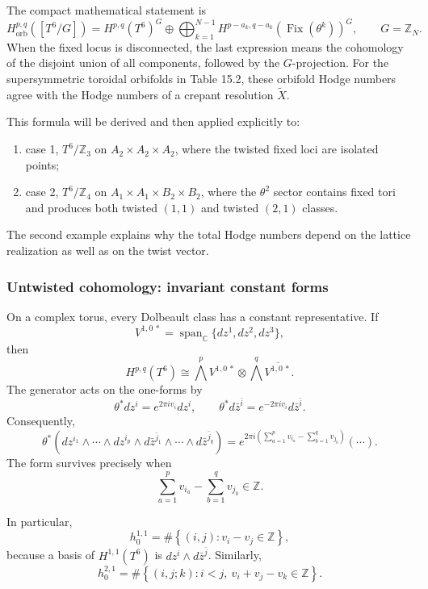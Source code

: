 \documentclass[
  10pt,
  a4paper,
  openany]{book}
\providecommand{\tightlist}{%
  \setlength{\itemsep}{0pt}\setlength{\parskip}{0pt}}
\begin{document}
The compact mathematical statement is \[
\boxed{
H_{\mathrm{orb}}^{p,q}([T^6/G])
=
H^{p,q}(T^6)^G
\oplus
\bigoplus_{k=1}^{N-1}
H^{p-a_k,q-a_k}\!\left(\operatorname{Fix}(\theta^k)\right)^G
},
\qquad G=\mathbb Z_N.
\] When the fixed locus is disconnected, the last expression means the
cohomology of the disjoint union of all components, followed by the
\(G\)-projection. For the supersymmetric toroidal orbifolds in Table
15.2, these orbifold Hodge numbers agree with the Hodge numbers of a
crepant resolution \(\widetilde X\).

This formula will be derived and then applied explicitly to:

\begin{enumerate}
\def\labelenumi{\arabic{enumi}.}
\tightlist
\item
  case 1, \(T^6/\mathbb Z_3\) on \(A_2\times A_2\times A_2\), where the
  twisted fixed loci are isolated points;
\item
  case 2, \(T^6/\mathbb Z_4\) on \(A_1\times A_1\times B_2\times B_2\),
  where the \(\theta^2\) sector contains fixed tori and produces both
  twisted \((1,1)\) and twisted \((2,1)\) classes.
\end{enumerate}

The second example explains why the total Hodge numbers depend on the
lattice realization as well as on the twist vector.

\subsubsection{Untwisted cohomology: invariant constant
forms}\label{untwisted-cohomology-invariant-constant-forms}

On a complex torus, every Dolbeault class has a constant representative.
If \[
V^{1,0\,*}
=\operatorname{span}_{\mathbb C}\{dz^1,dz^2,dz^3\},
\] then \[
H^{p,q}(T^6)
\cong
\bigwedge^p V^{1,0\,*}
\otimes
\bigwedge^q\overline{V^{1,0\,*}}.
\] The generator acts on the one-forms by \[
\theta^*dz^i=e^{2\pi i v_i}dz^i,
\qquad
\theta^*d\bar z^{\bar i}=e^{-2\pi i v_i}d\bar z^{\bar i}.
\] Consequently, \[
\theta^*
\left(
dz^{i_1}\wedge\cdots\wedge dz^{i_p}
\wedge
d\bar z^{\bar j_1}\wedge\cdots\wedge d\bar z^{\bar j_q}
\right)
=
e^{2\pi i\left(
\sum_{a=1}^p v_{i_a}
-
\sum_{b=1}^q v_{j_b}
\right)}
\left(\cdots\right).
\] The form survives precisely when \[
\sum_{a=1}^p v_{i_a}
-
\sum_{b=1}^q v_{j_b}
\in\mathbb Z.
\]

In particular, \[
h_0^{1,1}
=
\#\left\{(i,j):v_i-v_j\in\mathbb Z\right\},
\] because a basis of \(H^{1,1}(T^6)\) is
\(dz^i\wedge d\bar z^{\bar j}\). Similarly, \[
h_0^{2,1}
=
\#\left\{(i,j;k):
i<j,\ 
v_i+v_j-v_k\in\mathbb Z
\right\}.
\]
\end{document}
